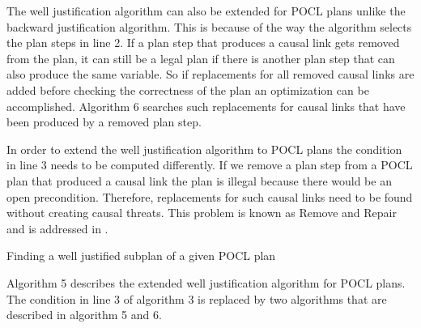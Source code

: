 The well justification algorithm can also be extended for POCL plans unlike the backward justification algorithm.
This is because of the way the algorithm selects the plan steps in line 2.
If a plan step that produces a causal link gets removed from the plan, it can still be a 
legal plan if there is another plan step that can also produce the same variable.
So if replacements for all removed causal links are added before checking the correctness of the plan an optimization can be accomplished.
Algorithm 6 searches such replacements for causal links that have been produced by a removed plan step.


In order to extend the well justification algorithm to POCL plans the condition in line 3 needs to be computed differently.
If we remove a plan step from a POCL plan that produced a causal link the plan is illegal because there would be an open precondition.
Therefore, replacements for such causal links need to be found without creating causal threats.
This problem is known as Remove and Repair and is addressed in \cite{RemoveRepair}.

\begin{algorithm}[H]
    \SetAlgoLined
    \vspace{2em}
    \caption{Finding a well justified subplan of a given POCL plan}
\end{algorithm}

Algorithm 5 describes the extended well justification algorithm for POCL plans.
The condition in line 3 of algorithm 3 is replaced by two algorithms that are described in algorithm 5 and 6. 

